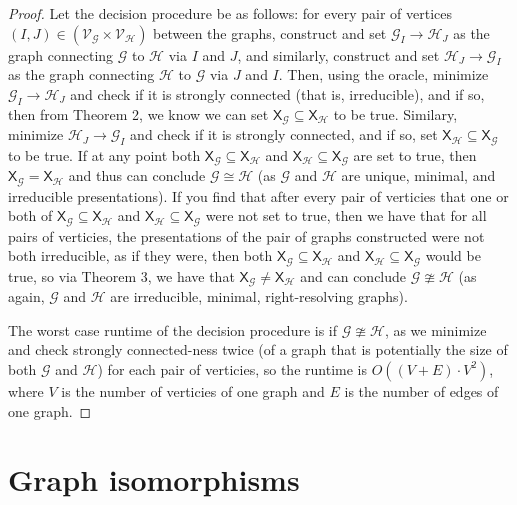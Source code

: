 \documentclass{article}
\newcommand{\Gc}{\mathcal{G}}  %
\newcommand{\Hc}{\mathcal{H}}  %
\newcommand{\Vc}{\mathcal{V}}
\newcommand{\shift}[1]{\mathsf{X}_{#1}}
\theoremstyle{definition}
\begin{document}
    \begin{proof}
        Let the decision procedure be as follows:
        for every pair of vertices
        \((I, J) \in (\Vc_\Gc \times \Vc_\Hc)\) between the graphs,
        construct and set \(\Gc_I\to\Hc_J\) as the graph connecting \(\Gc\) to \(\Hc\)
        via \(I\) and \(J\), and similarly, construct and set \(\Hc_J \to \Gc_I\) as the graph connecting 
        \(\Hc\) to \(\Gc\) via \(J\) and \(I\). Then,
        using the oracle, minimize \(\Gc_I \to \Hc_J\) and check if it is strongly connected (that is, irreducible),
        and if so, then from Theorem 2, we know we can 
        set \(\shift{\Gc} \subseteq \shift{\Hc}\) to be true.
        Similary, minimize \(\Hc_J \to \Gc_I\) and check if it is strongly connected, and 
        if so, set \(\shift{\Hc} \subseteq \shift{\Gc}\) to be true.
        If at any point both \(\shift{\Gc} \subseteq \shift{\Hc}\) and \(\shift{\Hc} \subseteq \shift{\Gc}\)
        are set to true, then \(\shift{\Gc} = \shift{\Hc}\) and thus can conclude \(\Gc \cong \Hc\) (as 
        \(\Gc\) and \(\Hc\) are unique, minimal, and irreducible presentations). If you find that 
        after every pair of verticies that one or both  
        of \(\shift{\Gc} \subseteq \shift{\Hc}\) and \(\shift{\Hc} \subseteq \shift{\Gc}\)
        were not set to true, then we have that for all pairs of verticies,
        the presentations of the pair of graphs constructed were not both 
        irreducible, as if they were, then both \(\shift{\Gc} \subseteq \shift{\Hc}\)
        and \(\shift{\Hc} \subseteq \shift{\Gc}\) would be true, so via Theorem 3, we have that \(\shift{\Gc} \neq \shift{\Hc}\)
        and can conclude \(\Gc \ncong \Hc\) (as again, \(\Gc\) and \(\Hc\) are irreducible, minimal, right-resolving 
        graphs).
        
        The worst case runtime of the decision procedure is if \(\Gc \ncong \Hc\),
        as we minimize and check strongly connected-ness twice 
        (of a graph that is potentially the size of both \(\Gc\) and \(\Hc\))
        for each pair of verticies, so the runtime is \(O((V+E)\cdot V^2)\),
        where \(V\) is the number of verticies of one graph and \(E\)
        is the number of edges of one graph.
    \end{proof}

\newpage

\section{Graph isomorphisms}
\end{document}
